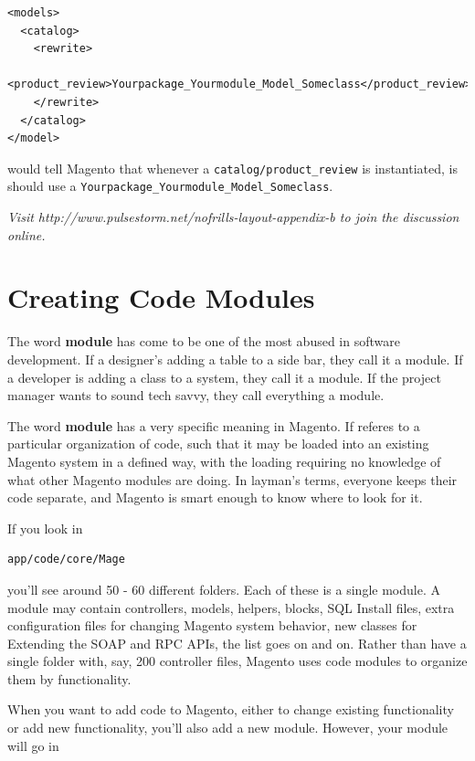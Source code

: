 \documentclass[oneside]{book}
\begin{document}
\begin{lstlisting}
<models>
  <catalog>
    <rewrite>
      <product_review>Yourpackage_Yourmodule_Model_Someclass</product_review>
    </rewrite>
  </catalog>    
</model>

\end{lstlisting}


would tell Magento that whenever a \footnotesize\texttt{catalog/product\_review} \normalsize  is instantiated, is should use a \footnotesize\texttt{Yourpackage\_Yourmodule\_Model\_Someclass}\normalsize.

\emph{Visit http://www.pulsestorm.net/nofrills-layout-appendix-b to join the discussion online.}
\chapter{Creating Code Modules}
The word \textbf{module} has come to be one of the most abused in software development.  If a designer's adding a table to a side bar, they call it a module.  If a developer is adding a class to a system, they call it a module.  If the project manager wants to sound tech savvy, they call everything a module.

The word \textbf{module} has a very specific meaning in Magento.  If referes to a particular organization of code, such that it may be loaded into an existing Magento system in a defined way, with the loading requiring no knowledge of what other Magento modules are doing.  In layman's terms, everyone keeps their code separate, and Magento is smart enough to know where to look for it.

If you look in

\begin{lstlisting}
app/code/core/Mage

\end{lstlisting}


you'll see around 50 - 60 different folders.  Each of these is a single module.  A module may contain controllers, models, helpers, blocks, SQL Install files, extra configuration files for changing Magento system behavior, new classes for Extending the SOAP and RPC APIs, the list goes on and on.  Rather than have a single folder with, say, 200 controller files, Magento uses code modules to organize them by functionality. 

When you want to add code to Magento, either to change existing functionality or add new functionality, you'll also add a new module.  However, your module will go in
\end{document}
